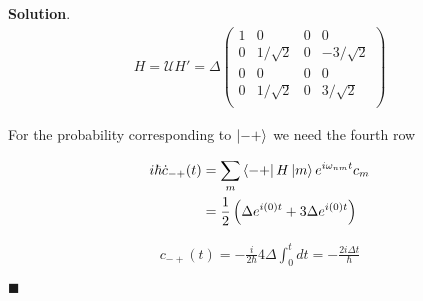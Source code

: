 \documentclass[12pt]{article}
\theoremstyle{definition}
\newenvironment{s}{%
        \begin{trivlist} \item \textbf{Solution}. }{%
            \hspace*{\fill} $\blacksquare$\end{trivlist}}%
\begin{document}
{\begin{s}
\begin{align*}
H = \mathcal{U}H' = 
\Delta\begin{pmatrix}
1 & 0 & 0 & 0\\
0 & 1/\sqrt{2} & 0 & -3/\sqrt{2}\\
0 & 0 & 0 & 0\\
0 & 1/\sqrt{2} & 0 & 3/\sqrt{2}\\
\end{pmatrix}
\end{align*}

For the probability corresponding to $\ket{-+}$ we need the fourth row

\begin{align*}
i\hbar\dot{c}_{-+}(t) &= \sum_{m}\bra{-+}H\ket{m}e^{i\omega_{nm}t}c_{m}\\
&= \frac{1}{2}\left(\Delta e^{i(0)t} + 3\Delta e^{i(0) t}\right)
\end{align*}

\begin{align*}
c_{-+}(t) = -\frac{i}{2\hbar}4\Delta\int_{0}^{t} dt = -\frac{2i \Delta t}{\hbar}
\end{align*}


\end{s}
\end{document}
